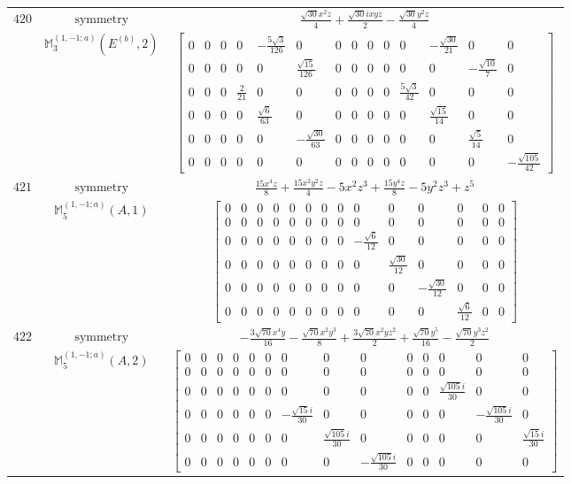 \documentclass[fleqn,8pt,landscape]{jsarticle}
\begin{document}
\begin{longtable}{ccc}
$ 420 $ & $ \text{symmetry} $ & $ \frac{\sqrt{30} x^{2} z}{4} + \frac{\sqrt{30} i x y z}{2} - \frac{\sqrt{30} y^{2} z}{4} $ \\
$  $ & $ \mathbb{M}_{3}^{(1,-1;a)}(E^{(b)},2) $ & $ \begin{bmatrix} 0 & 0 & 0 & 0 & - \frac{5 \sqrt{3}}{126} & 0 & 0 & 0 & 0 & 0 & 0 & - \frac{\sqrt{30}}{21} & 0 & 0 \\ 0 & 0 & 0 & 0 & 0 & \frac{\sqrt{15}}{126} & 0 & 0 & 0 & 0 & 0 & 0 & - \frac{\sqrt{10}}{7} & 0 \\ 0 & 0 & 0 & \frac{2}{21} & 0 & 0 & 0 & 0 & 0 & 0 & \frac{5 \sqrt{3}}{42} & 0 & 0 & 0 \\ 0 & 0 & 0 & 0 & \frac{\sqrt{6}}{63} & 0 & 0 & 0 & 0 & 0 & 0 & \frac{\sqrt{15}}{14} & 0 & 0 \\ 0 & 0 & 0 & 0 & 0 & - \frac{\sqrt{30}}{63} & 0 & 0 & 0 & 0 & 0 & 0 & \frac{\sqrt{5}}{14} & 0 \\ 0 & 0 & 0 & 0 & 0 & 0 & 0 & 0 & 0 & 0 & 0 & 0 & 0 & - \frac{\sqrt{105}}{42} \end{bmatrix} $ \\ \hline
$ 421 $ & $ \text{symmetry} $ & $ \frac{15 x^{4} z}{8} + \frac{15 x^{2} y^{2} z}{4} - 5 x^{2} z^{3} + \frac{15 y^{4} z}{8} - 5 y^{2} z^{3} + z^{5} $ \\
$  $ & $ \mathbb{M}_{5}^{(1,-1;a)}(A,1) $ & $ \begin{bmatrix} 0 & 0 & 0 & 0 & 0 & 0 & 0 & 0 & 0 & 0 & 0 & 0 & 0 & 0 \\ 0 & 0 & 0 & 0 & 0 & 0 & 0 & 0 & 0 & 0 & 0 & 0 & 0 & 0 \\ 0 & 0 & 0 & 0 & 0 & 0 & 0 & 0 & - \frac{\sqrt{6}}{12} & 0 & 0 & 0 & 0 & 0 \\ 0 & 0 & 0 & 0 & 0 & 0 & 0 & 0 & 0 & \frac{\sqrt{30}}{12} & 0 & 0 & 0 & 0 \\ 0 & 0 & 0 & 0 & 0 & 0 & 0 & 0 & 0 & 0 & - \frac{\sqrt{30}}{12} & 0 & 0 & 0 \\ 0 & 0 & 0 & 0 & 0 & 0 & 0 & 0 & 0 & 0 & 0 & \frac{\sqrt{6}}{12} & 0 & 0 \end{bmatrix} $ \\ \hline
$ 422 $ & $ \text{symmetry} $ & $ - \frac{3 \sqrt{70} x^{4} y}{16} - \frac{\sqrt{70} x^{2} y^{3}}{8} + \frac{3 \sqrt{70} x^{2} y z^{2}}{2} + \frac{\sqrt{70} y^{5}}{16} - \frac{\sqrt{70} y^{3} z^{2}}{2} $ \\
$  $ & $ \mathbb{M}_{5}^{(1,-1;a)}(A,2) $ & $ \begin{bmatrix} 0 & 0 & 0 & 0 & 0 & 0 & 0 & 0 & 0 & 0 & 0 & 0 & 0 & 0 \\ 0 & 0 & 0 & 0 & 0 & 0 & 0 & 0 & 0 & 0 & 0 & 0 & 0 & 0 \\ 0 & 0 & 0 & 0 & 0 & 0 & 0 & 0 & 0 & 0 & 0 & \frac{\sqrt{105} i}{30} & 0 & 0 \\ 0 & 0 & 0 & 0 & 0 & 0 & - \frac{\sqrt{15} i}{30} & 0 & 0 & 0 & 0 & 0 & - \frac{\sqrt{105} i}{30} & 0 \\ 0 & 0 & 0 & 0 & 0 & 0 & 0 & \frac{\sqrt{105} i}{30} & 0 & 0 & 0 & 0 & 0 & \frac{\sqrt{15} i}{30} \\ 0 & 0 & 0 & 0 & 0 & 0 & 0 & 0 & - \frac{\sqrt{105} i}{30} & 0 & 0 & 0 & 0 & 0 \end{bmatrix} $ \\ \hline

\end{longtable}
\end{document}
